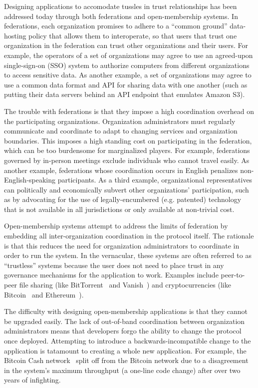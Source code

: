 Designing applications to accomodate tussles in trust relationships has been
addressed today through both federations and open-membership systems.
In federations, each organization promises to adhere to a
``common ground'' data-hosting policy that allows them to interoperate, so that
users that trust one organization in the federation can trust other
organizations and their users.
For example, the operators of a set of organizations may agree to use an agreed-upon
single-sign-on (SSO) system to authorize computers from different organizations
to access sensitive data.  As another example, a set of organizations may agree
to use a common data format and API for sharing data with one another (such as
putting their data servers behind an API endpoint that emulates Amazon S3).

The trouble with federations is that they impose a high coordination overhead on
the participating organizations.  Organization administrators must regularly
communicate and coordinate to adapt to changing services and organization
boundaries.  This imposes a high standing cost on participating in the
federation, which can be too burdensome for marginalized players.  For example,
federations governed by in-person meetings exclude individuals who cannot
travel easily.  As another example, federations whose coordination occurs in English
penalizes non-English-speaking participants.  As a third example, organizational
representatives can politically and economically subvert other organizations'
participation, such as by advocating for the use of legally-encumbered (e.g. patented)
technology that is not available in all jurisdictions or only
available at non-trivial cost.

Open-membership systems attempt to address the limits of federation by embedding
all inter-organization coordination in the protocol itself.  The rationale is
that this reduces the need for organization administrators to coordinate in
order to run the system.  In the vernacular, these systems are often referred to
as ``trustless'' systems because the user does not need to place trust in any
governance mechanisms for the application to work.  Examples include peer-to-peer file sharing
(like BitTorrent~\cite{bittorrent} and Vanish~\cite{vanish}) and cryptocurrencies (like
Bitcoin~\cite{bitcoin} and Ethereum~\cite{ethereum}).

The difficulty with designing open-membership applications is that they cannot
be upgraded easily.  The lack of out-of-band coordination between organization
administrators means that developers forgo the ability to change the protocol
once deployed.  Attempting to introduce a backwards-incompatible change to the
application is tatamount to creating a whole new application.  For example,
the Bitcoin Cash network~\cite{bcash} split off from the Bitcoin network 
due to a disagreement in the system's maximum throughput (a one-line code
change) after over two years of infighting.

